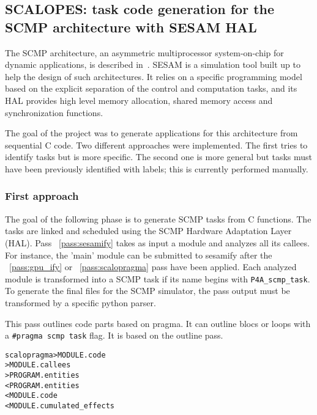 \documentclass[a4paper]{report}
\newenvironment{PipsMake}{\begin{alltt}}{\end{alltt}}
\newcommand{\PipsPassRef}[1]{\texttt{\detokenize{#1}}~\ref{pass:#1}}
\newenvironment{PipsPass}[1]{\label{pass:#1}}{}
\begin{document}
\subsection{SCALOPES: task code generation for the SCMP architecture with SESAM HAL}
\label{subsection-scalopes-project}

The SCMP architecture, an asymmetric multiprocessor system-on-chip for
dynamic applications, is described in~\cite{Ventroux2010}. SESAM is a
simulation tool built up to help the design of such architectures. It
relies on a specific programming model based on the explicit
separation of the control and computation tasks, and its HAL provides
high level memory allocation, shared memory access and synchronization
functions.

The goal of the project was to generate applications for this
architecture from sequential C code. Two different approaches were
implemented. The first tries to identify tasks but is more
specific. The second one is more general but tasks must have been
previously identified with labels; this is currently performed
manually.

\subsubsection{First approach}

The goal of the following phase is to generate SCMP tasks from C
functions. The tasks are linked and scheduled using the SCMP Hardware
Adaptation Layer (HAL). Pass \PipsPassRef{sesamify} takes as input a
module and analyzes all its callees. For instance, the 'main' module
can be submitted to sesamify after the \PipsPassRef{gpu_ify} or
\PipsPassRef{scalopragma} pass have been applied. Each analyzed module
is transformed into a SCMP task if its name begins with
\texttt{P4A\_scmp\_task}. To generate the final files for the SCMP
simulator, the pass output must be transformed by a specific python
parser.

\begin{PipsPass}{scalopragma}
This pass outlines code parts based on pragma.
It can outline blocs or loops with a \verb=#pragma scmp task= flag.
It is based on the outline pass.
\end{PipsPass}
\begin{PipsMake}
scalopragma                    > MODULE.code
                               > MODULE.callees
                               > PROGRAM.entities
               < PROGRAM.entities
               < MODULE.code
               < MODULE.cumulated_effects
\end{PipsMake}
\end{document}
